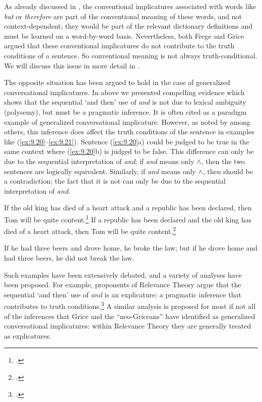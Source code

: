 As already discussed in , the conventional implicatures associated with words like \textit{but} or \textit{therefore} are part of the conventional meaning of these words, and not context-dependent; they would be part of the relevant dictionary definitions and must be learned on a word-by-word basis. Nevertheless, both Frege and Grice argued that these conventional implicatures do not contribute to the truth conditions of a sentence. So conventional meaning is not always truth-conditional. We will discuss this issue in more detail in .



The opposite situation has been argued to hold in the case of generalized conversational implicatures. In  above we presented compelling evidence which shows that the sequential ‘and then’ use of \textit{and} is not due to lexical ambiguity (polysemy), but must be a pragmatic inference. It is often cited as a paradigm example of generalized conversational implicature. However, as noted by \citet{Levinson1995,Levinson2000} among others, this inference does affect the truth conditions of the sentence in examples like (\ref{ex:9.20}--\ref{ex:9.21}). Sentence (\ref{ex:9.20}a) could be judged to be true in the same context where (\ref{ex:9.20}b) is judged to be false. This difference can only be due to the sequential interpretation of \textit{and}; if \textit{and} means only $\wedge$, then the two sentences are logically equivalent. Similarly, if \textit{and} means only $\wedge$, then  should be a contradiction; the fact that it is not can only be due to the sequential interpretation of \textit{and}.


\ea \label{ex:9.20}
\ea  If the old king has died of a heart attack and a republic has been declared, then Tom will be quite content.\footnote{\citet[58]{Cohen1971}.}
\ex  If a republic has been declared and the old king has died of a heart attack, then Tom will be quite content.\footnote{\citet[69]{Gazdar1979}.}
\z \z

\ea \label{ex:9.21}
If he had three beers and drove home, he broke the law; but if he drove home and had three beers, he did not break the law.
\z


Such examples have been extensively debated, and a variety of analyses have been proposed. For example, proponents of Relevance Theory argue that the sequential ‘and then’ use of \textit{and} is an explicature: a pragmatic inference that contributes to truth conditions.\footnote{\citet{Carston1988,Carston2004}.} A similar analysis is proposed for most if not all of the inferences that Grice and the “neo-Griceans” have identified as generalized conversational implicatures: within Relevance Theory they are generally treated as explicatures.



